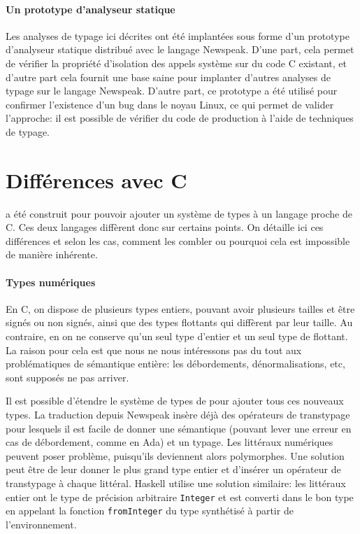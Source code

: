 \paragraph{Un prototype d'analyseur statique}

Les analyses de typage ici décrites ont été implantées sous forme d'un prototype
d'analyseur statique distribué avec le langage Newspeak.
D'une part, cela permet de vérifier la propriété d'isolation des appels système
sur du code C existant, et d'autre part cela fournit une base saine pour
implanter d'autres analyses de typage sur le langage Newspeak.
D'autre part, ce prototype a été utilisé pour confirmer l'existence d'un bug
dans le noyau Linux, ce qui permet de valider l'approche: il est possible de
vérifier du code de production à l'aide de techniques de typage.

\section{Différences avec C}

\langname a été construit pour pouvoir ajouter un système de types à un langage
proche de C. Ces deux langages diffèrent donc sur certains points. On détaille
ici ces différences et selon les cas, comment les combler ou pourquoi cela est
impossible de manière inhérente.

\paragraph{Types numériques}

En C, on dispose de plusieurs types entiers, pouvant avoir plusieurs tailles et
être signés ou non signés, ainsi que des types flottants qui diffèrent par leur
taille. Au contraire, en \langname{} on ne conserve qu'un seul type d'entier et
un seul type de flottant. La raison pour cela est que nous ne nous intéressons
pas du tout aux problématiques de sémantique entière: les débordements,
dénormalisations, etc, sont supposés ne pas arriver.

Il est possible d'étendre le système de types de \langname{} pour ajouter tous
ces nouveaux types. La traduction depuis Newspeak insère déjà des opérateurs de
transtypage pour lesquels il est facile de donner une sémantique (pouvant lever
une erreur en cas de débordement, comme en Ada) et un typage. Les littéraux
numériques peuvent poser problème, puisqu'ils deviennent alors polymorphes. Une
solution peut être de leur donner le plus grand type entier et d'insérer un
opérateur de transtypage à chaque littéral. Haskell utilise une solution
similaire: les littéraux entier ont le type de précision arbitraire
\texttt{Integer} et est converti dans le bon type en appelant la fonction
\texttt{fromInteger} du type synthétisé à partir de l'environnement.

